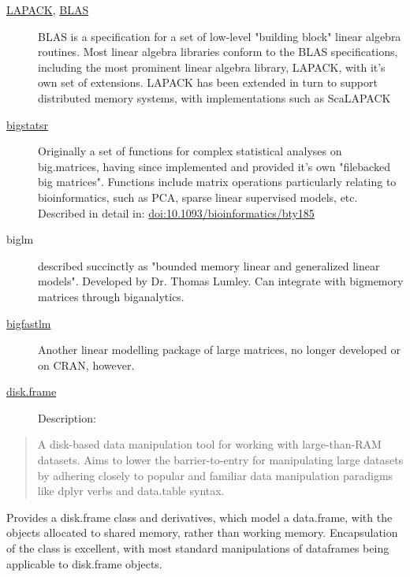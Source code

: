 \documentclass[a4paper, 11pt]{article}
\begin{document}
\begin{description}
\item[{\href{http://www.netlib.org/lapack/}{LAPACK}, \href{http://www.netlib.org/blas/}{BLAS}}] BLAS is a specification for a set of low-level
"building block" linear algebra routines. Most linear algebra
libraries conform to the BLAS specifications, including the most
prominent linear algebra library, LAPACK, with it's own set of
extensions. LAPACK has been extended in turn to support
distributed memory systems, with implementations such as
ScaLAPACK
\item[{\href{https://privefl.github.io/bigstatsr}{bigstatsr}}] Originally a set of functions for complex statistical
analyses on big.matrices, having since implemented and provided
it's own "filebacked big matrices". Functions include matrix
operations particularly relating to bioinformatics, such as PCA,
sparse linear supervised models, etc. Described in detail in:
\url{doi:10.1093/bioinformatics/bty185}
\item[{biglm}] described succinctly as "bounded memory linear and
generalized linear models". Developed by Dr. Thomas Lumley.
Can integrate with bigmemory matrices through biganalytics.
\item[{\href{https://github.com/jaredhuling/bigFastlm}{bigfastlm}}] Another linear modelling package of large matrices, no
longer developed or on CRAN, however.
\item[{\href{https://diskframe.com}{disk.frame}}] Description:
\end{description}
\begin{quote}
A disk-based data manipulation tool for working with large-than-RAM
datasets. Aims to lower the barrier-to-entry for manipulating large
datasets by adhering closely to popular and familiar data manipulation
paradigms like dplyr verbs and data.table syntax.
\end{quote}
Provides a disk.frame class and derivatives, which model a data.frame,
with the objects allocated to shared memory, rather than working
memory. Encapsulation of the class is excellent, with most standard
manipulations of dataframes being applicable to disk.frame objects.
\end{document}
